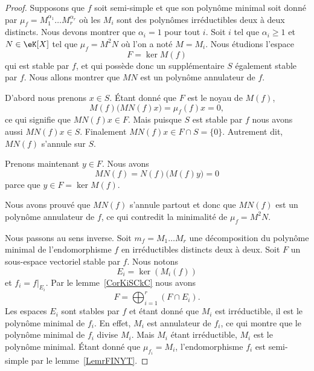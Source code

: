 \begin{proof}

	Supposons que \( f\) soit semi-simple et que son polynôme minimal soit donné par \( \mu_f=M_1^{\alpha_1}\ldots M_r^{\alpha_r}\) où les \( M_i\) sont des polynômes irréductibles deux à deux distincts. Nous devons montrer que \( \alpha_i=1\) pour tout \( i\). Soit \( i\) tel que \( \alpha_i\geq 1\) et \( N\in \eK[X]\) tel que \( \mu_f=M^2N\) où l'on a noté \( M=M_i\). Nous étudions l'espace
	\begin{equation}
		F=\ker M(f)
	\end{equation}
	qui est stable par \( f\), et qui possède donc un supplémentaire \( S\) également stable par \( f\). Nous allons montrer que \( MN\) est un polynôme annulateur de \( f\).

	D'abord nous prenons \( x\in S\). Étant donné que \( F\) est le noyau de \( M(f)\),
	\begin{equation}
		M(f)\big( MN(f)x \big)=\mu_f(f)x=0,
	\end{equation}
	ce qui signifie que \( MN(f)x\in F\). Mais puisque \( S\) est stable par \( f\) nous avons aussi \( MN(f)x\in S\). Finalement \( MN(f)x\in F\cap S=\{ 0 \}\). Autrement dit, \( MN(f)\) s'annule sur \( S\).

	Prenons maintenant \( y\in F\). Nous avons
	\begin{equation}
		MN(f)=N(f)\big( M(f)y \big)=0
	\end{equation}
	parce que \( y\in F=\ker M(f)\).

	Nous avons prouvé que \( MN(f)\) s'annule partout et donc que \( MN(f)\) est un polynôme annulateur de \( f\), ce qui contredit la minimalité de \( \mu_f=M^2N\).

	Nous passons au sens inverse. Soit \( m_f=M_1\ldots M_r\) une décomposition du polynôme minimal de l'endomorphisme \( f\) en irréductibles distincts deux à deux. Soit \( F\) un sous-espace vectoriel stable par \( f\). Nous notons
	\begin{equation}
		E_i=\ker(M_i(f))
	\end{equation}
	et \( f_i=f|_{E_i}\). Par le lemme~\ref{CorKiSCkC} nous avons
	\begin{equation}
		F=\bigoplus_{i=1}^r(F\cap E_i).
	\end{equation}
	Les espaces \( E_i\) sont stables par \( f\) et étant donné que \( M_i\) est irréductible, il est le polynôme minimal de \( f_i\). En effet, \( M_i\) est annulateur de \( f_i\), ce qui montre que le polynôme minimal de \( f_i\) divise \( M_i\). Mais \( M_i\) étant irréductible, \( M_i\) est le polynôme minimal. Étant donné que \( \mu_{f_i}=M_i\), l'endomorphisme \( f_i\) est semi-simple par le lemme~\ref{LemrFINYT}.


\end{proof}
